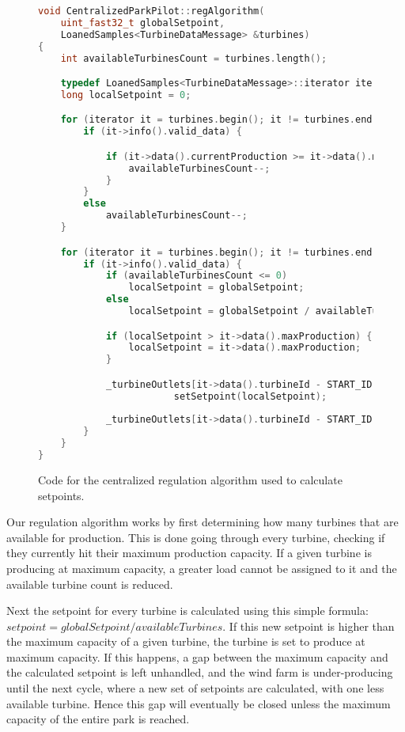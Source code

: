 \begin{figure}[!h]
	\centering
	\begin{lstlisting}[language=C++,tabsize=2,basicstyle=\small]
void CentralizedParkPilot::regAlgorithm(
	uint_fast32_t globalSetpoint,
	LoanedSamples<TurbineDataMessage> &turbines)
{
	int availableTurbinesCount = turbines.length();

	typedef LoanedSamples<TurbineDataMessage>::iterator iterator;
	long localSetpoint = 0;

	for (iterator it = turbines.begin(); it != turbines.end(); ++it) {
		if (it->info().valid_data) {

			if (it->data().currentProduction >= it->data().maxProduction) {
				availableTurbinesCount--;
			}
		}
		else
			availableTurbinesCount--;
	}

	for (iterator it = turbines.begin(); it != turbines.end(); ++it) {
		if (it->info().valid_data) {
			if (availableTurbinesCount <= 0)
				localSetpoint = globalSetpoint;
			else
				localSetpoint = globalSetpoint / availableTurbinesCount;

			if (localSetpoint > it->data().maxProduction) {
				localSetpoint = it->data().maxProduction;
			}

			_turbineOutlets[it->data().turbineId - START_ID]->
						setSetpoint(localSetpoint);
					
			_turbineOutlets[it->data().turbineId - START_ID]->publishData();
		}
	}
}
	\end{lstlisting}
	\caption[The regulation algorithm of the centralized solution]{
		\label{fig:cenRegAlgCode} 
		\footnotesize{%
			Code for the centralized regulation algorithm used to calculate setpoints.
		}
	}
\end{figure}


Our regulation algorithm works by first determining how many turbines that are available for production. This is done going through every turbine, checking if they currently hit their maximum production capacity. If a given turbine is producing at maximum capacity, a greater load cannot be assigned to it and the available turbine count is reduced. 

Next the setpoint for every turbine is calculated using this simple formula: $setpoint=globalSetpoint/availableTurbines$. If this new setpoint is higher than the maximum capacity of a given turbine, the turbine is set to produce at maximum capacity. If this happens, a gap between the maximum capacity and the calculated setpoint is left unhandled, and the wind farm is under-producing until the next cycle, where a new set of setpoints are calculated, with one less available turbine. Hence this gap will eventually be closed unless the maximum capacity of the entire park is reached.

